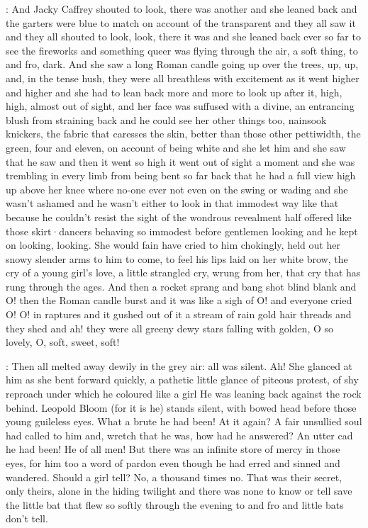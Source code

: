 :
And Jacky Caffrey shouted to look,
there was another and she leaned back
and the garters were blue to match on account of the transparent and they
all saw it and they all shouted to look,
look,
there it was and she leaned
back ever so far to see the fireworks and something queer was flying
through the air,
a soft thing,
to and fro,
dark.
And she saw a long Roman
candle going up over the trees,
up,
up,
and,
in the tense hush,
they were all breathless with excitement as it went higher and higher
and she had to lean back more and more to look up after it,
high,
high,
almost out of sight,
and her face was suffused with a divine,
an entrancing blush from straining back and he could see her other
things too,
nainsook knickers,
the fabric that caresses the skin,
better than those other pettiwidth,
the green,
four and eleven,
on account of being white and she let him and she saw that he saw and then
it went so high it went out of sight a moment and she was trembling in
every limb from being bent so far back that he had a full view
high up above her knee where no-one ever not even on the swing or wading
and she wasn't ashamed and he wasn't either
to look in that immodest way
like that because he couldn't resist the sight of the wondrous revealment
half offered like those skirt·dancers behaving so immodest before gentlemen
looking and he kept on looking,
looking.
She would fain have cried to him
chokingly,
held out her snowy slender arms to him to come,
to feel his
lips laid on her white brow,
the cry of a young girl's love,
a little
strangled cry,
wrung from her,
that cry that has rung through the ages.
And then a rocket sprang and bang shot blind blank and O!
then the Roman
candle burst and it was like a sigh of O!
and everyone cried O!
O!
in
raptures and it gushed out of it a stream of rain gold hair threads and
they shed and ah!
they were all greeny dewy stars falling with golden,
O so lovely,
O,
soft,
sweet,
soft!

:
Then all melted away dewily in the grey air:
all was silent.
Ah!
She
glanced at him as she bent forward quickly,
a pathetic little glance of
piteous protest,
of shy reproach under which he coloured like a girl
He was leaning back against the rock behind.
Leopold Bloom (for it is he)
stands silent,
with bowed head before those young guileless eyes.
What a
brute he had been!
At it again?
A fair unsullied soul had called to him
and,
wretch that he was,
how had he answered?
An utter cad he had been!
He of all men!
But there was an infinite store of mercy in those eyes,
for him too a word of pardon even though he had erred and sinned and
wandered.
Should a girl tell?
No,
a thousand times no.
That was their secret,
only theirs,
alone in the hiding twilight and there was none to
know or tell save the little bat that flew so softly through the evening
to and fro and little bats don't tell.

